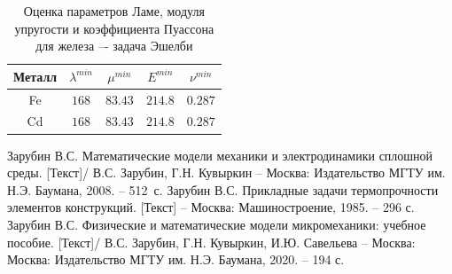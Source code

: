 \documentclass[12pt,a4paper]{article}
\begin{document}
\pagebreak

\begin{table}[h!]
    \centering
    \begin{tabular}{|c|c|c|c|c|}
        \hline 
        Металл & $ \lambda^{min}$ & $\mu^{min}$ & $E^{min}$ & $\nu^{min}$ \\
        \hline 
        Fe & $168$ & $83.43$ & $214.8$ & $0.287$ \\
        \hline
        Cd & $168$ & $83.43$ & $214.8$ & $0.287$ \\
        \hline 
    \end{tabular}
    \vspace{3mm}
    \caption{Оценка параметров Ламе, модуля упругости и коэффициента Пуассона для железа –- задача Эшелби}
 \end{table}

\begin{thebibliography}{6}
	Зарубин В.С. Математические модели механики и электродинамики сплошной среды. [Текст]/ В.С. Зарубин, Г.Н. Кувыркин -- Москва: Издательство МГТУ им. Н.Э. Баумана, 2008. -- 512~с.
 Зарубин В.С. Прикладные задачи термопрочности элементов конструкций. [Текст] -- Москва: Машиностроение, 1985. -- 296 с.  
 Зарубин В.С. Физические и математические модели микромеханики: учебное пособие. [Текст]/ В.С. Зарубин, Г.Н. Кувыркин, И.Ю. Савельева -- Москва: Москва: Издательство МГТУ им. Н.Э. Баумана, 2020. -- 194 с.
\end{thebibliography}
\end{document}

